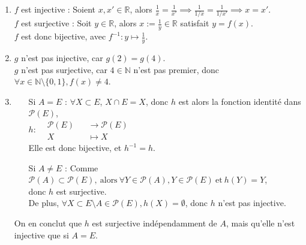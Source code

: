 \documentclass[a4paper, 10pt]{report}
\begin{document}
	\colorbox{solution}
	{\begin{minipage}{0.9\textwidth}
		\begin{enumerate}[label=\arabic*.]
			\item $f$ est injective : Soient $x, x' \in \mathbb{R}$,
			alors $\frac{1}{x} = \frac{1}{x'} \implies
				\frac{1}{1/x} = \frac{1}{1/x'} \implies x = x'$.\\
			$f$ est surjective : Soit $y \in \mathbb{R}$, alors
			$x := \frac{1}{y} \in \mathbb{R}$ satisfait $y = f(x)$.\\
			$f$ est donc bijective, avec $f^{-1}: y \mapsto \frac{1}{y}$.
			\vspace{6pt}
			\item $g$ n'est pas injective, car $g(2) = g(4)$.\\
			$g$ n'est pas surjective, car $4 \in \mathbb{N}$
			n'est pas premier, donc
			$\forall x \in \mathbb{N}\setminus\{0, 1\}, f(x) \neq 4$.
			\vspace{6pt}
			\item \begin{itemize}[leftmargin=20mm]
				\item[Si $A=E$ :] $\forall X \subset E$, $X \cap E = X$,
				donc $h$ est alors la fonction identité dans
				$\mathcal{P}(E)$,\\
				$h: \begin{aligned}
					&\mathcal{P}(E) &&\to \mathcal{P}(E)\\
					&X &&\mapsto X
				\end{aligned}$\\
				Elle est donc bijective, et $h^{-1} = h$.
				\item[Si $A \neq E$ :] Comme $\mathcal{P}(A) \subset
					\mathcal{P}(E),\ \text{alors}\
					\forall Y \in \mathcal{P}(A), Y \in \mathcal{P}(E)\
					\text{et}\ h(Y) = Y$,\\
					donc $h$ est surjective.\\
					De plus, $\forall X \subset E \setminus A \in
						\mathcal{P}(E), h(X) = \emptyset$, donc $h$
					n'est pas injective.
			\end{itemize}
			\vspace{6pt}
			On en conclut que $h$ est surjective indépendamment de $A$,
			mais qu'elle n'est injective que si $A = E$.
		\end{enumerate}
	\end{minipage}}

	\newpage
	
	\fancyhf{}
	\renewcommand{\headrule}
	{\rule{\textwidth}{0pt}}
		
\end{document}
